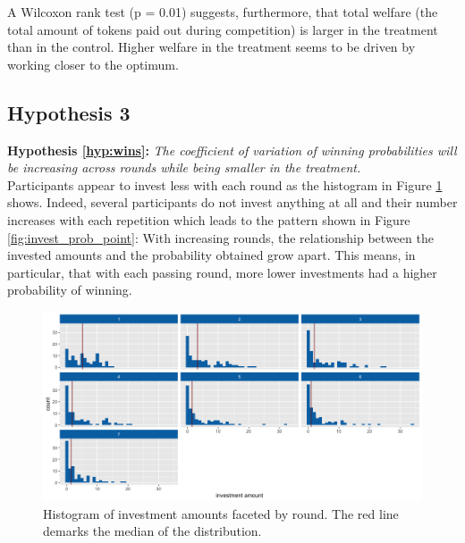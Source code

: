 A Wilcoxon rank test (p = 0.01) suggests, furthermore, that total welfare (the total amount of tokens paid out during competition) is larger in the treatment than in the control. Higher welfare in the treatment seems to be driven by working closer to the optimum.\\ 

\subsection{Hypothesis 3}

\textbf{Hypothesis \ref{hyp:wins}:} \textit{The coefficient of variation of winning probabilities will be increasing across rounds while being smaller in the treatment.}\\

Participants appear to invest less with each round as the histogram in Figure \ref{fig:invest_hist} shows. Indeed, several participants do not invest anything at all and their number increases with each repetition which leads to the pattern shown in Figure \ref{fig:invest_prob_point}: With increasing rounds, the relationship between the invested amounts and the probability obtained grow apart. This means, in particular, that with each passing round, more lower investments had a higher probability of winning.\\

\begin{figure}
    \centering
    \includegraphics[width=\textwidth]{graphs/investment_amount_hist.png}
    \caption{Histogram of investment amounts faceted by round. The red line demarks the median of the distribution.}
    \label{fig:invest_hist}
\end{figure}

